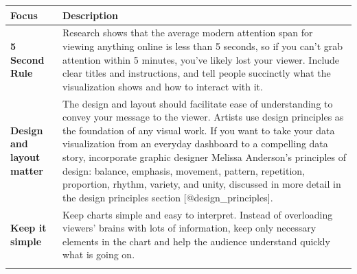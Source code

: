 \documentclass[]{book}
\theoremstyle{definition}
\theoremstyle{definition}
\theoremstyle{definition}
\theoremstyle{remark}
\begin{document}
\begin{longtable}[]{@{}ll@{}}
\toprule
\begin{minipage}[b]{0.16\columnwidth}\raggedright\strut
\textbf{Focus}\strut
\end{minipage} & \begin{minipage}[b]{0.78\columnwidth}\raggedright\strut
\textbf{Description}\strut
\end{minipage}\tabularnewline
\midrule
\endhead
\begin{minipage}[t]{0.16\columnwidth}\raggedright\strut
\textbf{5 Second Rule}\strut
\end{minipage} & \begin{minipage}[t]{0.78\columnwidth}\raggedright\strut
Research shows that the average modern attention span for viewing
anything online is less than 5 seconds, so if you can't grab attention
within 5 minutes, you've likely lost your viewer. Include clear titles
and instructions, and tell people succinctly what the visualization
shows and how to interact with it.\strut
\end{minipage}\tabularnewline
\begin{minipage}[t]{0.16\columnwidth}\raggedright\strut
\textbf{Design and layout matter}\strut
\end{minipage} & \begin{minipage}[t]{0.78\columnwidth}\raggedright\strut
The design and layout should facilitate ease of understanding to convey
your message to the viewer. Artists use design principles as the
foundation of any visual work. If you want to take your data
visualization from an everyday dashboard to a compelling data story,
incorporate graphic designer Melissa Anderson's principles of design:
balance, emphasis, movement, pattern, repetition, proportion, rhythm,
variety, and unity, discussed in more detail in the design principles
section {[}@design\_principles{]}.\strut
\end{minipage}\tabularnewline
\begin{minipage}[t]{0.16\columnwidth}\raggedright\strut
\textbf{Keep it simple}\strut
\end{minipage} & \begin{minipage}[t]{0.78\columnwidth}\raggedright\strut
Keep charts simple and easy to interpret. Instead of overloading
viewers' brains with lots of information, keep only necessary elements
in the chart and help the audience understand quickly what is going
on.\strut
\end{minipage}\tabularnewline
\begin{minipage}[t]{0.16\columnwidth}\raggedright\strut

\end{minipage}
\end{longtable}
\end{document}
